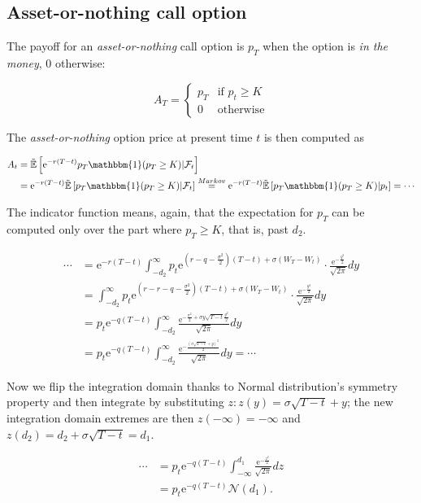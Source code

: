 \documentclass[oneside,titlepage,headinclude,12pt,a4paper,BCOR5mm,footinclude]{book}
\theoremstyle{defn}
\newcommand{\eexp}{\mathrm{e}}
\newcommand{\rnE}[1]{\mathbb{\tilde E}\left[ {#1} \right]}
\begin{document}
\subsection{Asset-or-nothing call option}

The payoff for an \textit{asset-or-nothing} call option is $p_T$ when the option
is \textit{in the money}, $0$ otherwise:

\[
  A_T = \left\{ \begin{array}{cl}
      p_T & \text{if } p_t \geq K \\
      0 & \text{otherwise}
    \end{array}
\]

The \textit{asset-or-nothing} option price at present time $t$ is then computed as

\begin{align*}
  A_t &= \rnE{ \eexp^{-r(T-t)} p_T \mathbbm{1}(p_T \geq K) | \mathcal{F}_t }
  \\&= \eexp^{-r(T-t)} \rnE{ p_T \mathbbm{1}(p_T \geq K) | \mathcal{F}_t }
       \stackrel{\small Markov}{=}
       \eexp^{-r(T-t)} \rnE{ p_T \mathbbm{1}(p_T \geq K) | p_t } = \cdots
\end{align*}

The indicator function means, again, that the expectation for $p_T$ can be computed only
over the part where $p_T \geq K$, that is, past $d_2$.

\begin{align*}
  \cdots &= \eexp^{-r(T-t)} \int_{-d_2}^\infty p_t \eexp^{\left(r-q-\frac{\sigma^2}{2}\right)(T-t)+\sigma (W_T-W_t)} 
            \cdot \frac{\eexp^{-\frac{y^2}{2}}}{\sqrt{2\pi}} dy
  \\&= \int_{-d_2}^\infty p_t \eexp^{\left(r-r-q-\frac{\sigma^2}{2}\right)(T-t)+\sigma (W_T-W_t)} 
       \cdot \frac{\eexp^{-\frac{y^2}{2}}}{\sqrt{2\pi}} dy
   \\&= p_t \eexp^{-q(T-t)} \int_{-d_2}^\infty \frac{\eexp^{-\frac{\sigma^2}{2}+\sigma y\sqrt{T-t}\frac{y^2}{2}}}{\sqrt{2\pi}} dy
   \\&= p_t \eexp^{-q(T-t)} \int_{-d_2}^\infty \frac{\eexp^{-\frac{(\sigma\sqrt{T-t} + y)^2}{2}}}{\sqrt{2\pi}} dy = \cdots
\end{align*}

Now  we flip  the integration  domain thanks  to Normal  distribution's symmetry
property and then  integrate by substituting $z : z(y)  = \sigma\sqrt{T-t} + y$;
the new integration domain extremes are  then $z(-\infty) = -\infty$ and $z(d_2)
= d_2 + \sigma\sqrt{T-t} = d_1$.

\begin{align*}
  \cdots &= p_t \eexp^{-q(T-t)} \int_{-\infty}^{d_1} \frac{\eexp^{-\frac{z^2}{2}}}{\sqrt{2\pi}} dz
  \\&= p_t \eexp^{-q(T-t)} \mathcal{N}(d_1).
\end{align*}
\end{document}
